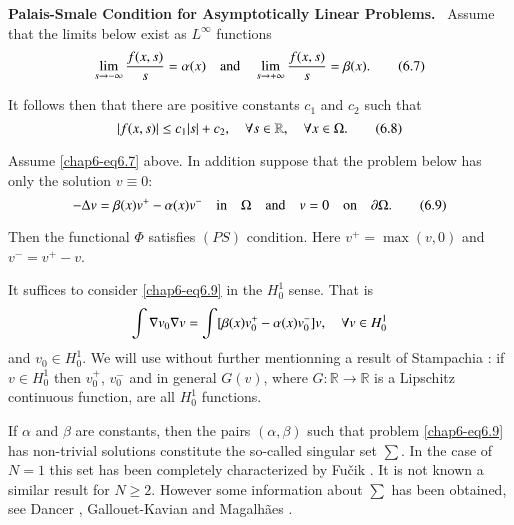 \noindent
{\bf Palais-Smale Condition for Asymptotically Linear Problems.}~
Assume that the limits below exist as $L^{\infty}$ functions 
\begin{equation*}
\lim\limits_{s\to -\infty}\frac{f(x,s)}{s}=\alpha (x)\quad\text{and}\quad
\lim\limits_{s\to
  +\infty}\frac{f(x,s)}{s}=\beta(x).\tag{6.7}\label{chap6-eq6.7} 
\end{equation*}

It follows then that there are positive constants $c_{1}$ and $c_{2}$
such that
\begin{equation*}
|f(x,s)|\leq c_{1}|s|+c_{2},\quad \forall s\in \mathbb{R},\quad \forall x\in
\Omega.\tag{6.8}\label{chap6-eq6.8} 
\end{equation*}

\begin{lemma}\label{chap6-lem6.3}
Assume \eqref{chap6-eq6.7} above. In addition suppose that the problem
below has only the solution $v\equiv 0$:
\begin{equation*}
-\Delta v=\beta(x)v^{+}-\alpha(x)v^{-}\quad\text{in}\quad
\Omega\quad\text{and}\quad v=0\quad\text{on}\quad
\partial\Omega.\tag{6.9}\label{chap6-eq6.9} 
\end{equation*}

Then the functional $\Phi$ satisfies $(PS)$ condition. Here
$v^{+}=\max(v,0)$ and $v^{-}=v^{+}-v$. 
\end{lemma}

\setcounter{remark}{0}
\begin{remark}\label{chap6-rem1}
It suffices to consider \eqref{chap6-eq6.9} in the $H^{1}_{0}$
sense. That is
$$
\int\nabla v_{0}\nabla v=\int
           [\beta(x)v^{+}_{0}-\alpha(x)v^{-}_{0}]v,\quad \forall v\in H^{1}_{0}
$$
and $v_{0}\in H^{1}_{0}$. We will use without further mentionning a
result of Stampachia \cite{key1}: if $v\in H^{1}_{0}$ then
$v^{+}_{0}$, $v^{-}_{0}$ and in general $G(v)$, where $G:\mathbb{R}\to
\mathbb{R}$ is a Lipschitz continuous function, are all $H^{1}_{0}$
functions. 
\end{remark}

\begin{remark}\label{chap6-rem2}
If $\alpha$ and $\beta$ are constants, then the pairs $(\alpha,\beta)$
such that problem \eqref{chap6-eq6.9} has non-trivial solutions
constitute the so-called singular set $\sum$. In the case of $N=1$
this set has been completely characterized by Fu\v{c}ik
\cite{key44}. It is not known a similar result for $N\geq 2$. However
some information about $\sum$ has been obtained, see Dancer
\cite{key29}, Gallouet-Kavian \cite{key45} and Magalh\~aes
\cite{key59}. 
\end{remark}

